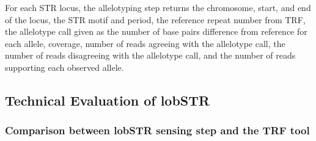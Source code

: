 For each STR locus, the allelotyping step returns the chromosome, start, and end of the locus, the STR motif and period, the reference repeat number from TRF, the allelotype call given as the number of base pairs difference from reference for each allele, coverage, number of reads agreeing with the allelotype call, the number of reads disagreeing with the allelotype call, and the number of reads supporting each observed allele.

\subsection{Technical Evaluation of lobSTR}
\subsubsection{Comparison between lobSTR sensing step and the TRF tool}
